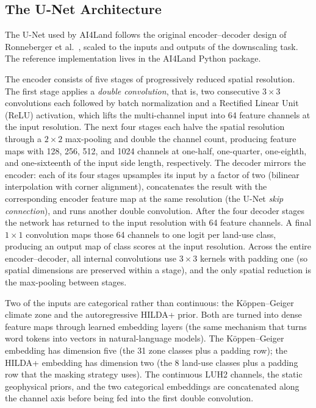 \documentclass[12pt,a4paper]{article}
\begin{document}
\subsection{The U-Net Architecture}

The U-Net used by AI4Land follows the original encoder--decoder design of
Ronneberger et al.~\cite{ronneberger2015unet}, scaled to the inputs and outputs of the
downscaling task. The reference implementation lives in the AI4Land Python package.

The encoder consists of five stages of progressively reduced spatial resolution. The first
stage applies a \emph{double convolution}, that is, two consecutive $3 \times 3$ convolutions
each followed by batch normalization and a Rectified Linear Unit (ReLU) activation, which
lifts the multi-channel input into 64 feature channels at the input resolution. The next four
stages each halve the spatial resolution through a $2 \times 2$ max-pooling and double the
channel count, producing feature maps with 128, 256, 512, and 1024 channels at one-half,
one-quarter, one-eighth, and one-sixteenth of the input side length, respectively. The
decoder mirrors the encoder: each of its four stages upsamples its input by a factor of two
(bilinear interpolation with corner alignment), concatenates the result with the corresponding
encoder feature map at the same resolution (the U-Net \emph{skip connection}), and runs
another double convolution. After the four decoder stages the network has returned to the
input resolution with 64 feature channels. A final $1 \times 1$ convolution maps those 64
channels to one logit per land-use class, producing an output map of class scores at the
input resolution. Across the entire encoder--decoder, all internal convolutions use
$3 \times 3$ kernels with padding one (so spatial dimensions are preserved within a stage),
and the only spatial reduction is the max-pooling between stages.

Two of the inputs are categorical rather than continuous: the K\"{o}ppen--Geiger climate zone
and the autoregressive HILDA+ prior. Both are turned into dense feature maps through learned
embedding layers (the same mechanism that turns word tokens into vectors in natural-language
models). The K\"{o}ppen--Geiger embedding has dimension five (the 31 zone classes plus a
padding row); the HILDA+ embedding has dimension two (the 8 land-use classes plus a padding
row that the masking strategy uses). The continuous LUH2 channels, the static geophysical
priors, and the two categorical embeddings are concatenated along the channel axis before
being fed into the first double convolution.
\end{document}
